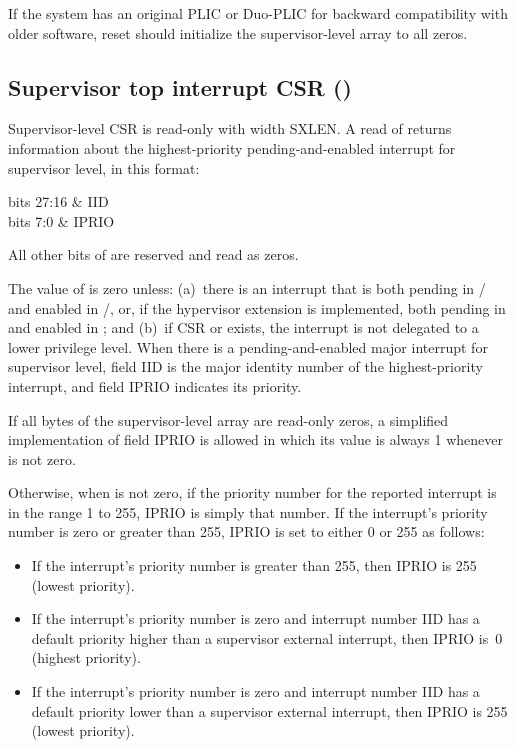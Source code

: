 If the system has an original PLIC or \mbox{Duo-PLIC} for backward
compatibility with older software, reset should initialize the
supervisor-level  array to all zeros.

\subsection{Supervisor top interrupt CSR ()}
\label{sec:stopi}

Supervisor-level CSR  is read-only with width SXLEN.
A read of  returns information about the highest-priority
pending-and-enabled interrupt for supervisor level, in this
format:\nopagebreak
\begin{displayLinesTable}[l@{\quad}l]
bits 27:16 & IID \\
bits 7:0   & IPRIO \\
\end{displayLinesTable}
All other bits of  are reserved and read as zeros.

The value of  is zero unless:
(a)~there is an interrupt that is both pending in /
and enabled in /, or, if the hypervisor extension is
implemented, both pending in  and enabled in ; and
(b)~if CSR  or  exists, the interrupt is not
delegated to a lower privilege level.
When there is a pending-and-enabled major interrupt for supervisor
level, field IID is the major identity number of the highest-priority
interrupt, and field IPRIO indicates its priority.

If all bytes of the supervisor-level  array are read-only
zeros, a simplified implementation of field IPRIO is allowed in which
its value is always 1 whenever  is not zero.

Otherwise, when  is not zero, if the priority number for the reported
interrupt is in the range 1 to 255, IPRIO is simply that number.
If the interrupt's priority number is zero or greater than 255,
IPRIO is set to either 0 or 255 as follows:
\begin{itemize}

\item
If the interrupt's priority number is greater than 255, then
IPRIO is 255 (lowest priority).

\item
If the interrupt's priority number is zero and interrupt number IID has
a default priority higher than a supervisor external interrupt, then
IPRIO is~0 (highest priority).

\item
If the interrupt's priority number is zero and interrupt number IID
has a default priority lower than a supervisor external interrupt, then
IPRIO is 255 (lowest priority).

\end{itemize}


